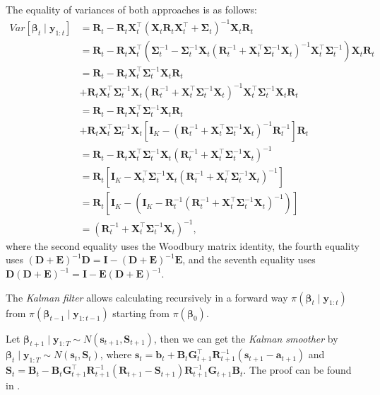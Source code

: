 The equality of variances of both approaches is as follows:
\begin{align*}
	Var[\bm{\beta}_t\mid \bm{y}_{1:t}]&
	= \bm{R}_{t}-\bm{R}_{t}\bm{X}_t^{\top}(\bm{X}_t\bm{R}_{t}\bm{X}_t^\top+\bm{\Sigma}_t)^{-1} \bm{X}_t\bm{R}_{t}\\
	&=\bm{R}_{t}-\bm{R}_{t}\bm{X}_t^{\top}(\bm{\Sigma}_t^{-1}- \bm{\Sigma}_t^{-1}\bm{X}_t(\bm{R}_{t}^{-1}+\bm{X}_t^{\top}\bm{\Sigma}_t^{-1}\bm{X}_t)^{-1}\bm{X}_t^{\top}\bm{\Sigma}_t^{-1})\bm{X}_t\bm{R}_{t}\\
	&=\bm{R}_{t}-\bm{R}_{t}\bm{X}_t^{\top}\bm{\Sigma}_t^{-1}\bm{X}_t\bm{R}_{t}\\
	&+ \bm{R}_{t}\bm{X}_t^{\top}\bm{\Sigma}_t^{-1}\bm{X}_t(\bm{R}_{t}^{-1}+\bm{X}_t^{\top}\bm{\Sigma}_t^{-1}\bm{X}_t)^{-1}\bm{X}_t^{\top}\bm{\Sigma}_t^{-1}\bm{X}_t\bm{R}_{t}\\
	&=\bm{R}_{t}-\bm{R}_{t}\bm{X}_t^{\top}\bm{\Sigma}_t^{-1}\bm{X}_t\bm{R}_{t}\\
	&+ \bm{R}_{t}\bm{X}_t^{\top}\bm{\Sigma}_t^{-1}\bm{X}_t[\bm{I}_K-(\bm{R}_{t}^{-1}+\bm{X}_t^{\top}\bm{\Sigma}_t^{-1}\bm{X}_t)^{-1}\bm{R}_{t}^{-1}]\bm{R}_{t}\\
	&=\bm{R}_{t}-\bm{R}_{t}\bm{X}_t^{\top}\bm{\Sigma}_t^{-1}\bm{X}_t(\bm{R}_{t}^{-1}+\bm{X}_t^{\top}\bm{\Sigma}_t^{-1}\bm{X}_t)^{-1}\\
	&=\bm{R}_t[\bm{I}_K-\bm{X}_t^{\top}\bm{\Sigma}_t^{-1}\bm{X}_t(\bm{R}_{t}^{-1}+\bm{X}_t^{\top}\bm{\Sigma}_t^{-1}\bm{X}_t)^{-1}]\\
	&=\bm{R}_{t}[\bm{I}_K-(\bm{I}_K-\bm{R}_{t}^{-1}(\bm{R}_{t}^{-1}+\bm{X}_t^{\top}\bm{\Sigma}_t^{-1}\bm{X}_t)^{-1})]\\
	&=(\bm{R}_{t}^{-1}+\bm{X}_t^{\top}\bm{\Sigma}_t^{-1}\bm{X}_t)^{-1},
\end{align*}
where the second equality uses the Woodbury matrix identity, the fourth equality uses $(\bm{D}+\bm{E})^{-1}\bm{D}=\bm{I}-(\bm{D}+\bm{E})^{-1}\bm{E}$, and the seventh equality uses $\bm{D}(\bm{D}+\bm{E})^{-1}=\bm{I}-\bm{E}(\bm{D}+\bm{E})^{-1}$.  

The \textit{Kalman filter} allows calculating recursively in a forward way $\pi(\bm{\beta}_t\mid \bm{y}_{1:t})$ from $\pi(\bm{\beta}_{t-1}\mid \bm{y}_{1:t-1})$ starting from $\pi(\bm{\beta}_0)$.

Let $\bm{\beta}_{t+1}\mid \bm{y}_{1:T}\sim N(\bm{s}_{t+1},\bm{S}_{t+1})$, then we can get the \textit{Kalman smoother} by $\bm{\beta}_{t}\mid \bm{y}_{1:T}\sim N(\bm{s}_{t},\bm{S}_{t})$, where $\bm{s}_t=\bm{b}_t+\bm{B}_t\bm{G}_{t+1}^{\top}\bm{R}_{t+1}^{-1}(\bm{s}_{t+1}-\bm{a}_{t+1})$ and $\bm{S}_t=\bm{B}_t-\bm{B}_t\bm{G}_{t+1}^{\top}\bm{R}_{t+1}^{-1}(\bm{R}_{t+1}-\bm{S}_{t+1})\bm{R}_{t+1}^{-1}\bm{G}_{t+1}\bm{B}_{t}$. The proof can be found in \cite[Chap~2]{petris2009dynamic}. 

